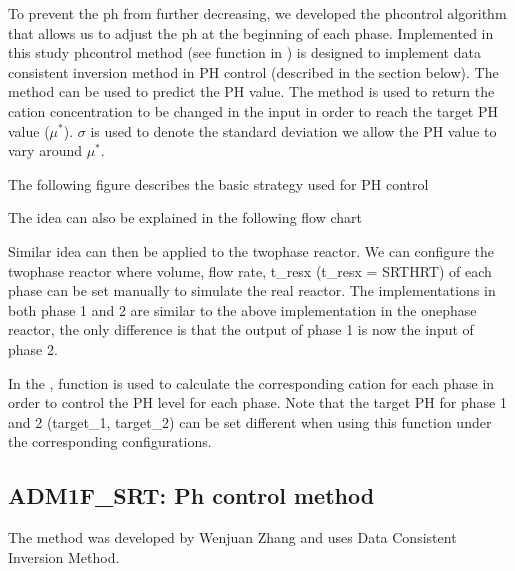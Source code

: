 \documentclass[a4paper,10pt,english]{sphinxmanual}
\let\sphinxpxdimen\pdfpxdimen\else\newdimen\sphinxpxdimen
\begin{document}
\sphinxAtStartPar
To prevent the ph from further decreasing, we developed the ph\sphinxhyphen{}control algorithm that allows us to adjust the ph at the beginning of each phase.
Implemented in this study ph\sphinxhyphen{}control method (see  function in  ) is designed to implement data consistent inversion method in PH control (described in the section below). The  method can be used to predict the PH value. The  method is used to return the cation concentration to be changed in the input in order to reach the target PH value (\(\mu^*\)). \(\sigma\) is used to denote the standard deviation we allow the PH value to vary around \(\mu^*\).

\sphinxAtStartPar
The following figure describes the basic strategy used for PH control

\noindent\sphinxincludegraphics[width=559\sphinxpxdimen,height=416\sphinxpxdimen]{{phcontrol}.png}

\sphinxAtStartPar
The idea can also be explained in the following flow chart

\noindent\sphinxincludegraphics[width=1502\sphinxpxdimen,height=1125\sphinxpxdimen]{{flow1}.png}

\sphinxAtStartPar
Similar idea can then be applied to the two\sphinxhyphen{}phase reactor. We can configure the two\sphinxhyphen{}phase reactor where volume, flow rate, t\_resx (t\_resx = SRT\sphinxhyphen{}HRT) of each phase can be set manually to simulate the real reactor. The implementations in both phase 1 and 2 are similar to the above implementation in the one\sphinxhyphen{}phase reactor, the only difference is that the output of phase 1 is now the input of phase 2.

\sphinxAtStartPar
In the {\hyperref[\detokenize{jupyter_notebook/ph-control::doc}]{}},  function is used to calculate the corresponding cation for each phase in order to control the PH level for each phase. Note that the target PH for phase 1 and 2 (target\_1, target\_2) can be set different when using this function under the corresponding configurations.


\subsection{ADM1F\_SRT: Ph control method}
\label{\detokenize{jupyter_notebook/ph-control:ADM1F_SRT:-Ph-control-method}}\label{\detokenize{jupyter_notebook/ph-control::doc}}
\sphinxAtStartPar
The  method was developed by Wenjuan Zhang and uses Data Consistent Inversion Method.
\end{document}
